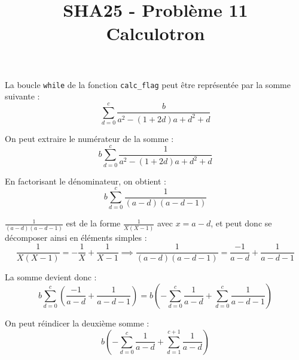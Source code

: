 \documentclass{article}
\title{SHA25 - Problème 11 \\ \Large{Calculotron}}
\date{}
\begin{document}
\maketitle

La boucle \texttt{while} de la fonction \texttt{calc\_flag} peut être représentée par la somme suivante :
\begin{equation}
   \displaystyle\sum_{d=0}^{c} \frac{b}{a^2-(1+2d)a+d^2+d}
\end{equation}

\vspace{5mm}

On peut extraire le numérateur de la somme :
\begin{equation}
   b\displaystyle\sum_{d=0}^{c} \frac{1}{a^2-(1+2d)a+d^2+d}
\end{equation}

\vspace{5mm}

En factorisant le dénominateur, on obtient :
\begin{equation}
   b\displaystyle\sum_{d=0}^{c} \frac{1}{(a-d)(a-d-1)}
\end{equation}

\vspace{5mm}

$\frac{1}{(a-d)(a-d-1)}$  est de la forme $\frac{1}{X(X-1)}$ avec $x=a-d$, et peut donc se décomposer ainsi en éléments simples :
\begin{equation}
   \frac{1}{X(X-1)} = -\frac{1}{X}+\frac{1}{X-1} \implies \frac{1}{(a-d)(a-d-1)} = \frac{-1}{a-d} + \frac{1}{a-d-1}
\end{equation}

\vspace{5mm}

La somme devient donc :
\begin{equation}
   b\displaystyle\sum_{d=0}^{c} \left(\frac{-1}{a-d} + \frac{1}{a-d-1}\right) = b \left(-\displaystyle\sum_{d=0}^{c} \frac{1}{a-d} + \displaystyle\sum_{d=0}^{c} \frac{1}{a-d-1}\right)
\end{equation}

\vspace{5mm}

On peut réindicer la deuxième somme :
\begin{equation}
   b \left(-\displaystyle\sum_{d=0}^{c} \frac{1}{a-d} + \displaystyle\sum_{d=1}^{c+1} \frac{1}{a-d}\right)
\end{equation}

\vspace{5mm}
\end{document}
